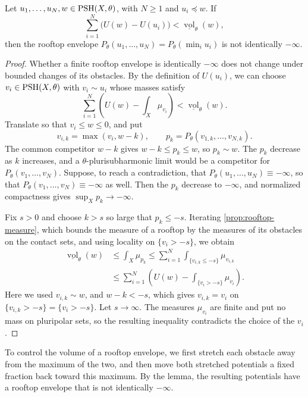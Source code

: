 \begin{lemma}\label{lem:finite-roof-volume-deficit}
Let $u_1,\ldots,u_N,w\in\mathrm{PSH}(X,\theta)$, with $N\geq1$ and $u_i\preceq w$. If
\[
 \sum_{i=1}^N\bigl(U(w)-U(u_i)\bigr)
       <\underline{\operatorname{vol}}_\theta(w),
\]
then the rooftop envelope $P_\theta(u_1,\ldots,u_N)=P_\theta(\min_iu_i)$ is not identically $-\infty$.
\end{lemma}
\begin{proof}
Whether a finite rooftop envelope is identically $-\infty$ does not change under bounded changes of its obstacles. By the definition of $U(u_i)$, we can choose $v_i\in\mathrm{PSH}(X,\theta)$ with $v_i\sim u_i$ whose masses satisfy
\[
 \sum_{i=1}^N\left(U(w)-\int_X\mu_{v_i}\right)
       <\underline{\operatorname{vol}}_\theta(w).
\]
Translate so that $v_i\leq w\leq0$, and put
\[
 v_{i,k}=\max(v_i,w-k),\qquad
 p_k=P_\theta(v_{1,k},\ldots,v_{N,k}).
\]
The common competitor $w-k$ gives $w-k\leq p_k\leq w$, so $p_k\sim w$. The $p_k$ decrease as $k$ increases, and a $\theta$-plurisubharmonic limit would be a competitor for $P_\theta(v_1,\ldots,v_N)$. Suppose, to reach a contradiction, that $P_\theta(u_1,\ldots,u_N)\equiv-\infty$, so that $P_\theta(v_1,\ldots,v_N)\equiv-\infty$ as well. Then the $p_k$ decrease to $-\infty$, and normalized compactness gives $\sup_Xp_k\to-\infty$.

Fix $s>0$ and choose $k>s$ so large that $p_k\leq-s$. Iterating \cref{prop:rooftop-measure}, which bounds the measure of a rooftop by the measures of its obstacles on the contact sets, and using locality on $\{v_i>-s\}$, we obtain
\[
 \begin{split}
 \underline{\operatorname{vol}}_\theta(w)
 &\leq\int_X\mu_{p_k}
 \leq\sum_{i=1}^N\int_{\{v_{i,k}\leq-s\}}\mu_{v_{i,k}}\\
 &\leq\sum_{i=1}^N\left(U(w)-\int_{\{v_i>-s\}}\mu_{v_i}\right).
 \end{split}
\]
Here we used $v_{i,k}\sim w$, and $w-k<-s$, which gives $v_{i,k}=v_i$ on $\{v_{i,k}>-s\}=\{v_i>-s\}$. Let $s\to\infty$. The measures $\mu_{v_i}$ are finite and put no mass on pluripolar sets, so the resulting inequality contradicts the choice of the $v_i$.
\end{proof}

To control the volume of a rooftop envelope, we first stretch each obstacle away from the maximum of the two, and then move both stretched potentials a fixed fraction back toward this maximum. By the lemma, the resulting potentials have a rooftop envelope that is not identically $-\infty$.

